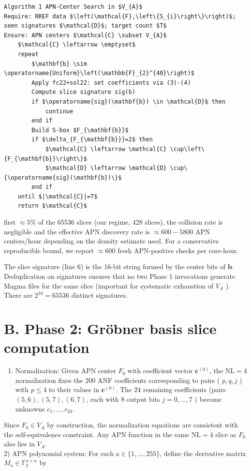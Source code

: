 \documentclass[10pt]{article}
\begin{document}
\begin{verbatim}
Algorithm 1 APN-Center Search in $V_{A}$
Require: RREF data $\left(\mathcal{F},\left\{S_{i}\right\}\right)$; seen signatures $\mathcal{D}$; target count $T$
Ensure: APN centers $\mathcal{C} \subset V_{A}$
    $\mathcal{C} \leftarrow \emptyset$
    repeat
        $\mathbf{b} \sim \operatorname{Uniform}\left(\mathbb{F}_{2}^{40}\right)$
        Apply fc22+sol22: set coefficients via (3)-(4)
        Compute slice signature sig(b)
        if $\operatorname{sig}(\mathbf{b}) \in \mathcal{D}$ then
            continue
        end if
        Build S-box $F_{\mathbf{b}}$
        if $\delta_{F_{\mathbf{b}}}=2$ then
            $\mathcal{C} \leftarrow \mathcal{C} \cup\left\{F_{\mathbf{b}}\right\}$
            $\mathcal{D} \leftarrow \mathcal{D} \cup\{\operatorname{sig}(\mathbf{b})\}$
        end if
    until $|\mathcal{C}|=T$
    return $\mathcal{C}$
\end{verbatim}

first $\approx 5 \%$ of the 65536 slices (our regime, 428 slices), the collision rate is negligible and the effective APN discovery rate is $\approx 600-5800$ APN centers/hour depending on the density estimate used. For a conservative reproducible bound, we report $\approx 600$ fresh APN-positive checks per core-hour.

The slice signature (line 6) is the 16-bit string formed by the center bits of $\mathbf{b}$. Deduplication on signatures ensures that no two Phase 1 invocations generate Magma files for the same slice (important for systematic exhaustion of $V_{A}$ ). There are $2^{16}=65536$ distinct signatures.

\section*{B. Phase 2: Gröbner basis slice computation}
\begin{enumerate}
  \item Normalization: Given APN center $F_{0}$ with coefficient vector $\mathbf{c}^{(0)}$, the $\mathrm{NL}=4$ normalization fixes the 200 ANF coefficients corresponding to pairs ( $p, q, j$ ) with $p \leq 4$ to their values in $\mathbf{c}^{(0)}$. The 24 remaining coefficients (pairs $(5,6),(5,7),(6,7)$, each with 8 output bits $j=0, \ldots, 7$ ) become unknowns $c_{1}, \ldots, c_{24}$.
\end{enumerate}

Since $F_{0} \in V_{A}$ by construction, the normalization equations are consistent with the self-equivalence constraint. Any APN function in the same $\mathrm{NL}=4$ slice as $F_{0}$ also lies in $V_{A}$.\\
2) APN polynomial system: For each $a \in\{1, \ldots, 255\}$, define the derivative matrix $M_{a} \in \mathbb{F}_{2}^{n \times n}$ by
\end{document}
